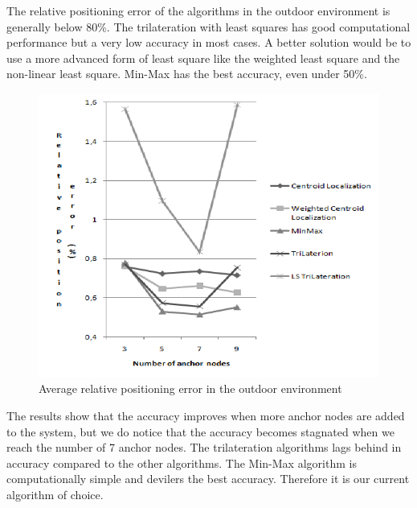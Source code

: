 The relative positioning error of the algorithms in the outdoor environment is generally below 80\%. The trilateration with least squares has good computational performance but a very low accuracy in most cases. A better solution would be to use a more advanced form of least square like the weighted least square and the non-linear least square.
Min-Max has the best accuracy, even under 50\%.
\begin{figure}[h]
	\centering
		\includegraphics[scale=0.5]{Images/OutdoorAccuracy.png}
	\caption{Average relative positioning error in the outdoor environment}
	\label{fig:OutdoorAccuracy}
\end{figure}
The results show that the accuracy improves when more anchor nodes are added to the system, but we do notice that the accuracy becomes stagnated when we reach the number of 7 anchor nodes. The trilateration algorithms lags behind in accuracy compared to the other algorithms. The Min-Max algorithm is computationally simple and devilers the best accuracy. Therefore it is our current algorithm of choice.